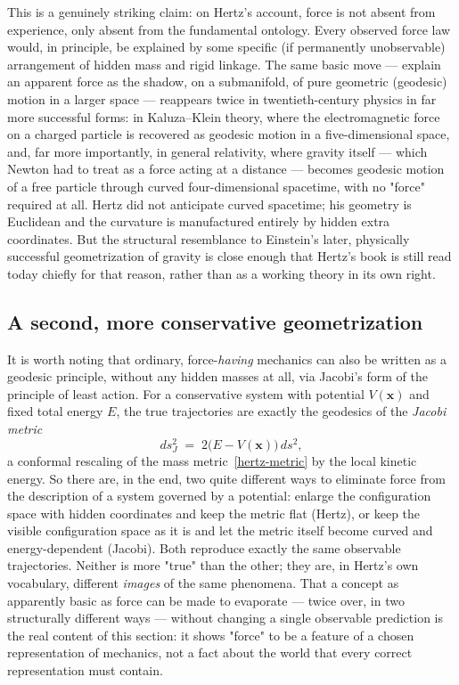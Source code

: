 This is a genuinely striking claim: on Hertz's account, force is not
absent from experience, only absent from the fundamental ontology.
Every observed force law would, in principle, be explained by some
specific (if permanently unobservable) arrangement of hidden mass
and rigid linkage. The same basic move --- explain an apparent force
as the shadow, on a submanifold, of pure geometric (geodesic) motion
in a larger space --- reappears twice in twentieth-century physics
in far more successful forms: in Kaluza--Klein theory, where the
electromagnetic force on a charged particle is recovered as geodesic
motion in a five-dimensional space, and, far more importantly, in
general relativity, where gravity itself --- which Newton had to
treat as a force acting at a distance --- becomes geodesic motion of
a free particle through curved four-dimensional spacetime, with no
"force" required at all. Hertz did not anticipate curved spacetime;
his geometry is Euclidean and the curvature is manufactured entirely
by hidden extra coordinates. But the structural resemblance to
Einstein's later, physically successful geometrization of gravity is
close enough that Hertz's book is still read today chiefly for that
reason, rather than as a working theory in its own
right.

\subsection{A second, more conservative geometrization}

It is worth noting that ordinary, force-\emph{having} mechanics can
also be written as a geodesic principle, without any hidden masses
at all, via Jacobi's form of the principle of least action. For a
conservative system with potential $V(\mathbf x)$ and fixed total
energy $E$, the true trajectories are exactly the geodesics of the
\emph{Jacobi metric}
\begin{equation}
  ds_J^2 \;=\; 2\bigl(E-V(\mathbf x)\bigr)\, ds^2 ,
  \label{jacobi-metric}
\end{equation}
a conformal rescaling of the mass metric~\eqref{hertz-metric} by
the local kinetic energy. So there are, in the end, two quite
different ways to eliminate force from the description of a system
governed by a potential: enlarge the configuration space with hidden
coordinates and keep the metric flat (Hertz), or keep the visible
configuration space as it is and let the metric itself become curved
and energy-dependent (Jacobi). Both reproduce exactly the same
observable trajectories. Neither is more "true" than the other; they
are, in Hertz's own vocabulary, different \emph{images} of the same
phenomena. That a concept as apparently basic as force can be made
to evaporate --- twice over, in two structurally different ways ---
without changing a single observable prediction is the real content
of this section: it shows "force" to be a feature of a chosen
representation of mechanics, not a fact about the world that every
correct representation must contain.

